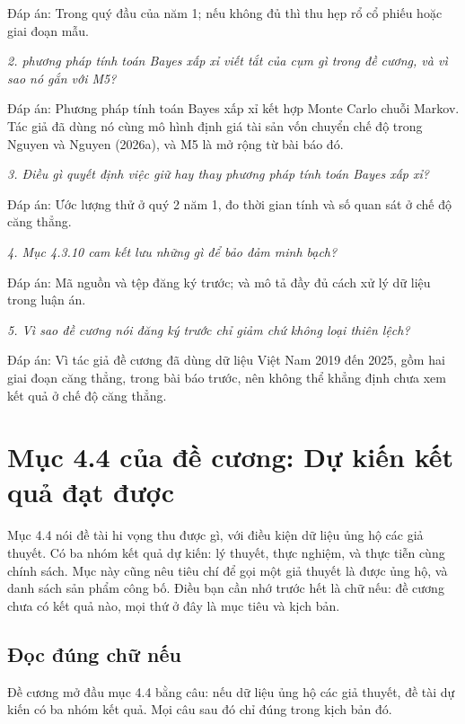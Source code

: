 Đáp án: Trong quý đầu của năm 1; nếu không đủ thì thu hẹp rổ cổ phiếu hoặc giai đoạn mẫu.

{\itshape 2. phương pháp tính toán Bayes xấp xỉ viết tắt của cụm gì trong đề cương, và vì sao nó gắn với M5?\par}

Đáp án: Phương pháp tính toán Bayes xấp xỉ kết hợp Monte Carlo chuỗi Markov. Tác giả đã dùng nó cùng mô hình định giá tài sản vốn chuyển chế độ trong Nguyen và Nguyen (2026a), và M5 là mở rộng từ bài báo đó.

{\itshape 3. Điều gì quyết định việc giữ hay thay phương pháp tính toán Bayes xấp xỉ?\par}

Đáp án: Ước lượng thử ở quý 2 năm 1, đo thời gian tính và số quan sát ở chế độ căng thẳng.

{\itshape 4. Mục 4.3.10 cam kết lưu những gì để bảo đảm minh bạch?\par}

Đáp án: Mã nguồn và tệp đăng ký trước; và mô tả đầy đủ cách xử lý dữ liệu trong luận án.

{\itshape 5. Vì sao đề cương nói đăng ký trước chỉ giảm chứ không loại thiên lệch?\par}

Đáp án: Vì tác giả đề cương đã dùng dữ liệu Việt Nam 2019 đến 2025, gồm hai giai đoạn căng thẳng, trong bài báo trước, nên không thể khẳng định chưa xem kết quả ở chế độ căng thẳng.

\chapter{Mục 4.4 của đề cương: Dự kiến kết quả đạt được}

Mục 4.4 nói đề tài hi vọng thu được gì, với điều kiện dữ liệu ủng hộ các giả thuyết. Có ba nhóm kết quả dự kiến: lý thuyết, thực nghiệm, và thực tiễn cùng chính sách. Mục này cũng nêu tiêu chí để gọi một giả thuyết là được ủng hộ, và danh sách sản phẩm công bố. Điều bạn cần nhớ trước hết là chữ nếu: đề cương chưa có kết quả nào, mọi thứ ở đây là mục tiêu và kịch bản.

\section{Đọc đúng chữ nếu}

Đề cương mở đầu mục 4.4 bằng câu: nếu dữ liệu ủng hộ các giả thuyết, đề tài dự kiến có ba nhóm kết quả. Mọi câu sau đó chỉ đúng trong kịch bản đó.

